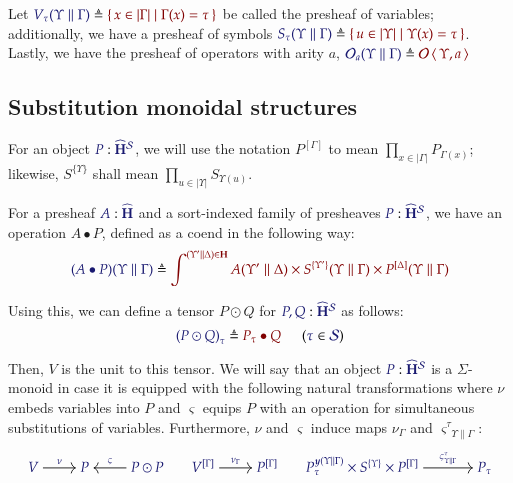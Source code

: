 \documentclass[11pt]{article}
\theoremstyle{definition}
\theoremstyle{remark}
\numberwithin{equation}{section}
\def\IModeColorName{MidnightBlue}
\def\OModeColorName{Maroon}
\newcommand\IMode[1]{{\color{\IModeColorName}{#1}}}
\newcommand\OMode[1]{{\color{\OModeColorName}{#1}}}
\newcommand\HypJ[2]{#1\ \ (#2)}
\newcommand\MkSet[1]{\left\{\,#1\,\right\}}
\newcommand\Member[2]{\IMode{#1}\in\IMode{#2}}
\newcommand\Of[2]{\IMode{#1}: \IMode{#2}}
\newcommand\Sorts{\mathcal{S}}
\newcommand\Operators{\mathcal{O}}
\newcommand\HypCat{\mathbf{H}}
\newcommand\Pair[2]{\left\langle\,#1,#2\,\right\rangle}
\newcommand\Dom[1]{\left\vert#1\right\vert}
\newcommand\Define[2]{\IMode{#1}\triangleq\OMode{#2}}
\newcommand\Yoneda[1]{\boldsymbol{y} (#1)}
\begin{document}
Let $\Define{V_\tau(\Upsilon\parallel\Gamma)}{\MkSet{x\in\Dom\Gamma\mid
\Gamma(x)=\tau}}$ be called the presheaf of variables; additionally, we have a
presheaf of symbols
$\Define{S_\tau(\Upsilon\parallel\Gamma)}{\MkSet{u\in\Dom\Upsilon\mid
\Upsilon(x)=\tau}}$. Lastly, we have the presheaf of operators with arity $a$,
$\Define{\Operators_a(\Upsilon\parallel\Gamma)}{\Operators\Pair{\Upsilon}{a}}$

\subsection{Substitution monoidal structures}

For an object $\Of{P}{\widehat{\HypCat}^\Sorts}$, we will use the notation
$P^{[\Gamma]}$ to mean $\prod_{x\in\Dom\Gamma}P_{\Gamma(x)}$; likewise,
$S^{\{\Upsilon\}}$ shall mean $\prod_{u\in\Dom\Upsilon}S_{\Upsilon(u)}$.

For a presheaf $\Of{A}{\widehat{\HypCat}}$ and a sort-indexed family of
presheaves $\Of{P}{\widehat{\HypCat}^\Sorts}$, we have an operation $A\bullet
P$, defined as a coend in the following way:
\[
  \Define{(A\bullet P)(\Upsilon\parallel\Gamma)}{
    \int^{(\Upsilon'\parallel\Delta)\in\HypCat}
      A(\Upsilon'\parallel\Delta)
      \times S^{\{\Upsilon'\}}(\Upsilon\parallel\Gamma)
      \times P^{[\Delta]}(\Upsilon\parallel\Gamma)
  }
\]

Using this, we can define a tensor $P\odot Q$ for
$\Of{P,Q}{\widehat{\HypCat}^\Sorts}$ as follows:
\[
  \HypJ{
    \Define{{(P\odot Q)}_{\tau}}{
      P_\tau\bullet Q
    }
    \quad
  }{
    \Member{\tau}{\Sorts}
  }
\]

Then, $V$ is the unit to this tensor. We will say that an object
$\Of{P}{\widehat{\HypCat}^\Sorts}$ is a $\Sigma$-monoid in case it is equipped
with the following natural transformations where $\nu$ embeds variables into
$P$ and $\varsigma$ equips $P$ with an operation for simultaneous substitutions
of variables. Furthermore, $\nu$ and $\varsigma$ induce maps ${\nu}_{\Gamma}$ and
${{\varsigma}^{\tau}}_{\Upsilon\parallel\Gamma}$:
\vspace{-0.5em}
\[
  \begin{tikzcd}[cramped, ampersand replacement = \&]
    {\IMode{V}} \arrow[r, "\IMode\nu"]
    \& {\IMode{P}}
    \& {\IMode{P\odot P}}
    \arrow[l, "\IMode\varsigma", swap]
  \end{tikzcd}
  \qquad\begin{tikzcd}[cramped, ampersand replacement = \&]
    {\IMode{{V}^{[\Gamma]}}}
      \arrow[r, "\IMode{{\nu}_{\Gamma}}"]
    \& {\IMode{{P}^{[\Gamma]}}}
  \end{tikzcd}
  \qquad\begin{tikzcd}[cramped, sep = large, ampersand replacement = \&]
    {\IMode{{P_\tau^{\Yoneda{\Upsilon\parallel\Gamma}}\times S^{\{\Upsilon\}}\times P^{[\Gamma]}}}}
      \arrow[r, "\IMode{\varsigma^\tau_{\Upsilon\parallel\Gamma}}"]
    \& {\IMode{P_\tau}}
  \end{tikzcd}
\]
\end{document}
